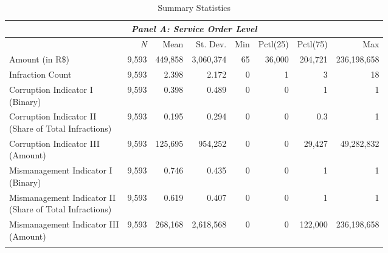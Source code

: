 \documentclass[11pt]{article}
\newcommand\T{\rule{0pt}{2.6ex}}       %
\newcommand\B{\rule[-1.2ex]{0pt}{0pt}} %
\begin{document}
\begin{table}[!htbp]
  \caption{\label{tab:descriptivestatistics}Summary Statistics}
  \centering
  \small
  \begin{tabular}{lrrrrrrr}
  \hline

  \hline
  \multicolumn{8}{c}{\emph{Panel A: Service Order Level}} \T \B \\
  \hline
  & \multicolumn{1}{r}{\emph{N}} & \multicolumn{1}{r}{Mean} & \multicolumn{1}{r}{St. Dev.} & \multicolumn{1}{r}{Min} & \multicolumn{1}{r}{Pctl(25)} & \multicolumn{1}{r}{Pctl(75)} & \multicolumn{1}{r}{Max} \T \B \\
  \hline
  \makecell[cl]{Amount \\ \footnotesize{(in R\$)}}                                        & 9,593 & 449,858 & 3,060,374 & 65 & 36,000 & 204,721 & 236,198,658 \T \B \\
  Infraction Count                                                                        & 9,593 & 2.398   & 2.172     & 0  & 1      & 3       & 18          \T \B \\
  \makecell[cl]{Corruption Indicator I \\ {\footnotesize(Binary)}}                        & 9,593 & 0.398   & 0.489     & 0  & 0      & 1       & 1           \T \B \\
  \makecell[cl]{Corruption Indicator II \\ {\footnotesize(Share of Total Infractions)}}   & 9,593 & 0.195   & 0.294     & 0  & 0      & 0.3     & 1           \T \B \\
  \makecell[cl]{Corruption Indicator III \\ {\footnotesize(Amount)}}                      & 9,593 & 125,695 & 954,252   & 0  & 0      & 29,427  & 49,282,832  \T \B \\
  \makecell[cl]{Mismanagement Indicator I \\ {\footnotesize(Binary)}}                     & 9,593 & 0.746   & 0.435     & 0  & 0      & 1       & 1           \T \B \\
  \makecell[cl]{Mismanagement Indicator II \\ {\footnotesize(Share of Total Infractions)}}& 9,593 & 0.619   & 0.407     & 0  & 0      & 1       & 1           \T \B \\
  \makecell[cl]{Mismanagement Indicator III \\ {\footnotesize(Amount)}}                   & 9,593 & 268,168 & 2,618,568 & 0  & 0      & 122,000 & 236,198,658 \T \B \\
  \hline
  \multicolumn{8}{c}{}\\

\end{tabular}
\end{table}
\end{document}
